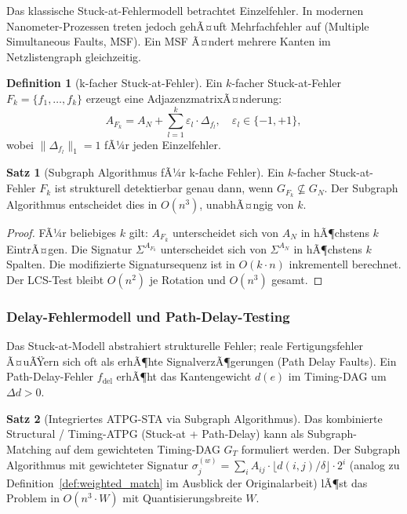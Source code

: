 ﻿\documentclass[a4paper,12pt]{article}
\theoremstyle{definition}
\newtheorem{definition}{Definition}
\newtheorem{satz}{Satz}
\begin{document}
Das klassische Stuck-at-Fehlermodell betrachtet Einzelfehler. In modernen
Nanometer-Prozessen treten jedoch gehÃ¤uft Mehrfachfehler auf (Multiple Simultaneous
Faults, MSF). Ein MSF Ã¤ndert mehrere Kanten im Netzlistengraph gleichzeitig.

\begin{definition}[k-facher Stuck-at-Fehler]\label{def:kfach}
  Ein $k$-facher Stuck-at-Fehler $F_k = \{f_1, \ldots, f_k\}$ erzeugt eine
  AdjazenzmatrixÃ¤nderung:
  \[
    A_{F_k} = A_N + \sum_{l=1}^{k} \varepsilon_l \cdot \Delta_{f_l},
    \quad \varepsilon_l \in \{-1, +1\},
  \]
  wobei $\|\Delta_{f_l}\|_1 = 1$ fÃ¼r jeden Einzelfehler.
\end{definition}

\begin{satz}[Subgraph Algorithmus fÃ¼r k-fache Fehler]\label{satz:kfachfehler}
  Ein $k$-facher Stuck-at-Fehler $F_k$ ist strukturell detektierbar genau dann, wenn
  $G_{F_k} \not\subseteq G_N$. Der Subgraph Algorithmus entscheidet dies in
  $O(n^3)$, unabhÃ¤ngig von $k$.
\end{satz}

\begin{proof}
  FÃ¼r beliebiges $k$ gilt: $A_{F_k}$ unterscheidet sich von $A_N$ in hÃ¶chstens $k$
  EintrÃ¤gen. Die Signatur $\Sigma^{A_{F_k}}$ unterscheidet sich von $\Sigma^{A_N}$
  in hÃ¶chstens $k$ Spalten. Die modifizierte Signatursequenz ist in $O(k \cdot n)$
  inkrementell berechnet. Der LCS-Test bleibt $O(n^2)$ je Rotation und $O(n^3)$
  gesamt.
\end{proof}

\subsubsection{Delay-Fehlermodell und Path-Delay-Testing}

Das Stuck-at-Modell abstrahiert strukturelle Fehler; reale Fertigungsfehler Ã¤uÃŸern
sich oft als erhÃ¶hte SignalverzÃ¶gerungen (Path Delay Faults). Ein Path-Delay-Fehler
$f_{\text{del}}$ erhÃ¶ht das Kantengewicht $d(e)$ im Timing-DAG um $\Delta d > 0$.

\begin{satz}[Integriertes ATPG-STA via Subgraph Algorithmus]\label{satz:atpgsta}
  Das kombinierte Structural / Timing-ATPG (Stuck-at + Path-Delay) kann als
  Subgraph-Matching auf dem gewichteten Timing-DAG $G_T$ formuliert werden.
  Der Subgraph Algorithmus mit gewichteter Signatur
  $\sigma_j^{(w)} = \sum_i A_{ij} \cdot \lfloor d(i,j)/\delta \rfloor \cdot 2^i$
  (analog zu Definition~\ref{def:weighted_match} im Ausblick der Originalarbeit)
  lÃ¶st das Problem in $O(n^3 \cdot W)$ mit Quantisierungsbreite $W$.
\end{satz}
\end{document}
